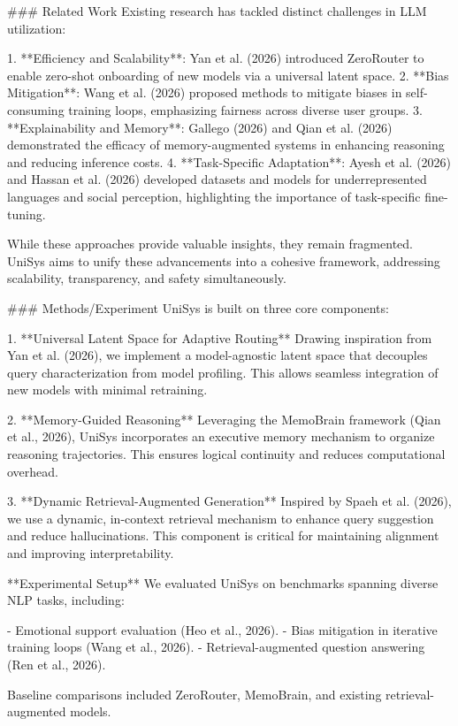 ### Related Work  
Existing research has tackled distinct challenges in LLM utilization:

1. **Efficiency and Scalability**: Yan et al. (2026) introduced ZeroRouter to enable zero-shot onboarding of new models via a universal latent space.  
2. **Bias Mitigation**: Wang et al. (2026) proposed methods to mitigate biases in self-consuming training loops, emphasizing fairness across diverse user groups.  
3. **Explainability and Memory**: Gallego (2026) and Qian et al. (2026) demonstrated the efficacy of memory-augmented systems in enhancing reasoning and reducing inference costs.  
4. **Task-Specific Adaptation**: Ayesh et al. (2026) and Hassan et al. (2026) developed datasets and models for underrepresented languages and social perception, highlighting the importance of task-specific fine-tuning.  

While these approaches provide valuable insights, they remain fragmented. UniSys aims to unify these advancements into a cohesive framework, addressing scalability, transparency, and safety simultaneously.

### Methods/Experiment  
UniSys is built on three core components:

1. **Universal Latent Space for Adaptive Routing**  
   Drawing inspiration from Yan et al. (2026), we implement a model-agnostic latent space that decouples query characterization from model profiling. This allows seamless integration of new models with minimal retraining.

2. **Memory-Guided Reasoning**  
   Leveraging the MemoBrain framework (Qian et al., 2026), UniSys incorporates an executive memory mechanism to organize reasoning trajectories. This ensures logical continuity and reduces computational overhead.

3. **Dynamic Retrieval-Augmented Generation**  
   Inspired by Spaeh et al. (2026), we use a dynamic, in-context retrieval mechanism to enhance query suggestion and reduce hallucinations. This component is critical for maintaining alignment and improving interpretability.

**Experimental Setup**  
We evaluated UniSys on benchmarks spanning diverse NLP tasks, including:

- Emotional support evaluation (Heo et al., 2026).
- Bias mitigation in iterative training loops (Wang et al., 2026).
- Retrieval-augmented question answering (Ren et al., 2026).

Baseline comparisons included ZeroRouter, MemoBrain, and existing retrieval-augmented models.

